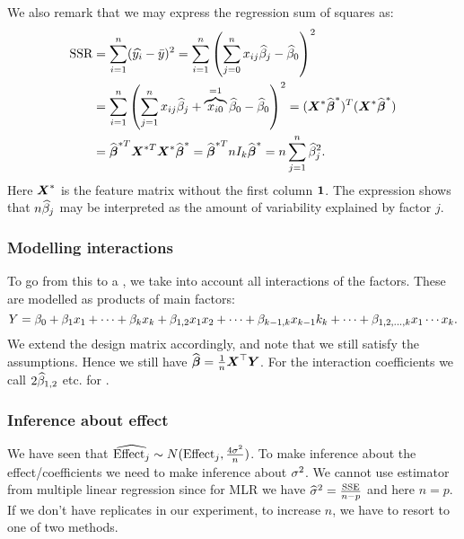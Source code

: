 We also remark that we may express the regression sum of squares as:
\begin{align*}
    \textrm{SSR} 
    &= \sum_{i=1}^{n} (\widehat{y_i} - \bar{y})^2 
    = \sum_{i=1}^{n} \left( \sum_{j=0}^{n} x_{ij} \widehat{\beta}_j - \widehat{\beta}_0 \right)^2 
    \\&= \sum_{i=1}^{n} \left( \sum_{j=1}^{n} x_{ij} \widehat{\beta}_j + \overbrace{x_{i0}}^{=1} \widehat{\beta}_0 - \widehat{\beta}_0 \right)^2
    = (\boldsymbol{X}^* \widehat{\boldsymbol{\beta}}^*)^T (\boldsymbol{X}^* \widehat{\boldsymbol{\beta}}^*)
    \\&= \widehat{\boldsymbol{\beta}}^{*T} \boldsymbol{X}^{*T} \boldsymbol{X}^* \widehat{\boldsymbol{\beta}}^* 
    = \widehat{\boldsymbol{\beta}}^{*T} n I_k \widehat{\boldsymbol{\beta}}^* 
    = n \sum_{j=1}^{n} \widehat{\beta}_j^2.
\end{align*}
Here $\boldsymbol{X}^*$ is the feature matrix without the first column $\boldsymbol{1}$. The expression shows that $n\widehat{\beta}_j$ may be interpreted as the amount of variability explained by factor $j$.

\subsubsection{Modelling interactions}

To go from this to a , we take into account all interactions of the factors. These are modelled as products of main factors:
$$
    Y = \beta_0 + \beta_1x_1+\dots+\beta_kx_k + \beta_{1,2}x_1x_2 + \dots+\beta_{k-1,k}x_{k-1}k_{k}+\dots+\beta_{1,2,\dots,k}x_1\cdots x_k.
$$
We extend the design matrix accordingly, and note that we still satisfy the assumptions. Hence we still have $\widehat{\boldsymbol{\beta}} = \frac{1}{n}\boldsymbol{X}^\top\boldsymbol{Y}$. For the interaction coefficients we call $2\widehat{\beta}_{1,2}$ etc. for . 

\subsubsection{Inference about effect}

We have seen that $\widehat{\textrm{Effect}_j} \sim N(\textrm{Effect}_j, \frac{4\sigma^2}{n})$. To make inference about the effect/coefficients we need to make inference about $\sigma^2$. We cannot use estimator from multiple linear regression since for MLR we have $\widehat{\sigma}^2=\frac{\textrm{SSE}}{n-p}$ and here $n=p$. If we don't have replicates in our experiment, to increase $n$, we have to resort to one of two methods.

